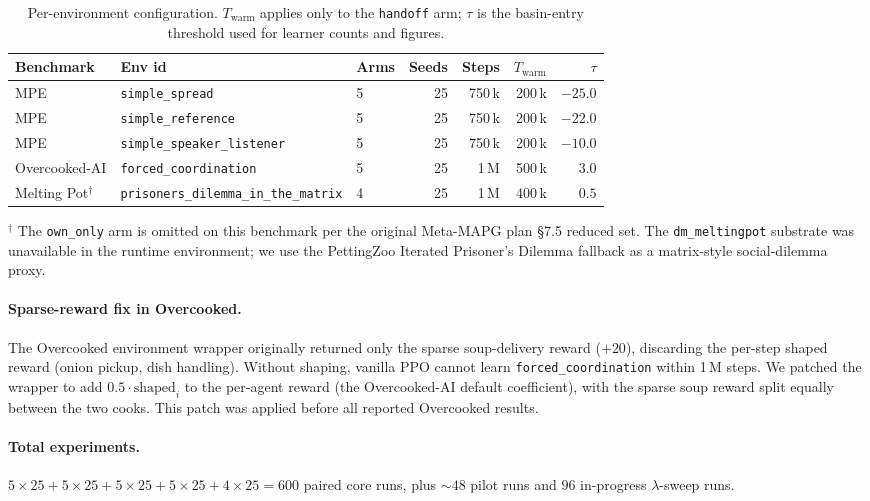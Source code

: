 \documentclass[11pt,a4paper]{article}
\newcommand{\arm}[1]{\texttt{#1}}
\newcommand{\thr}{\tau}
\newcommand{\Twarm}{T_{\text{warm}}}
\begin{document}
\begin{table}[h]
\centering
\caption{Per-environment configuration. $\Twarm$ applies only to the \arm{handoff} arm; $\thr$ is the basin-entry threshold used for learner counts and figures.}
\label{tab:thresholds}
\begin{tabular}{lllrrrr}
\toprule
\textbf{Benchmark} & \textbf{Env id} & \textbf{Arms} & \textbf{Seeds} & \textbf{Steps} & $\Twarm$ & $\thr$ \\
\midrule
MPE                & \texttt{simple\_spread}                          & 5 & 25 & 750\,k  & 200\,k & $-25.0$ \\
MPE                & \texttt{simple\_reference}                       & 5 & 25 & 750\,k  & 200\,k & $-22.0$ \\
MPE                & \texttt{simple\_speaker\_listener}               & 5 & 25 & 750\,k  & 200\,k & $-10.0$ \\
Overcooked-AI      & \texttt{forced\_coordination}                    & 5 & 25 & 1\,M    & 500\,k & $\phantom{-}3.0$ \\
Melting Pot$^\dagger$ & \texttt{prisoners\_dilemma\_in\_the\_matrix}  & 4 & 25 & 1\,M    & 400\,k & $\phantom{-}0.5$ \\
\bottomrule
\end{tabular}

\medskip
\footnotesize
$^\dagger$ The \arm{own\_only} arm is omitted on this benchmark per the original Meta-MAPG plan §7.5 reduced set.
The \texttt{dm\_meltingpot} substrate was unavailable in the runtime environment;
we use the PettingZoo Iterated Prisoner's Dilemma fallback as a matrix-style social-dilemma proxy.
\end{table}

\paragraph{Sparse-reward fix in Overcooked.}
The Overcooked environment wrapper originally returned only the sparse soup-delivery reward ($+20$), discarding the per-step shaped reward (onion pickup, dish handling).
Without shaping, vanilla PPO cannot learn \texttt{forced\_coordination} within 1\,M steps.
We patched the wrapper to add $0.5 \cdot \mathrm{shaped}_i$ to the per-agent reward (the Overcooked-AI default coefficient), with the sparse soup reward split equally between the two cooks.
This patch was applied before all reported Overcooked results.

\paragraph{Total experiments.}
$5 \times 25 + 5 \times 25 + 5 \times 25 + 5 \times 25 + 4 \times 25 = 600$ paired core runs, plus $\sim 48$ pilot runs and $96$ in-progress $\lambda$-sweep runs.
\end{document}
